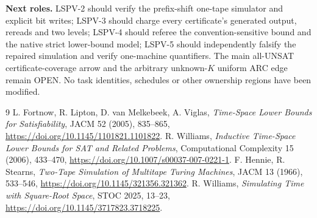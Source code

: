 \documentclass[11pt]{article}
\begin{document}
\noindent\textbf{Next roles.} LSPV-2 should verify the prefix-shift one-tape simulator and explicit bit writes; LSPV-3 should charge every certificate's generated output, rereads and two levels; LSPV-4 should referee the convention-sensitive bound and the native strict lower-bound model; LSPV-5 should independently falsify the repaired simulation and verify one-machine quantifiers. The main all-UNSAT certificate-coverage arrow and the arbitrary unknown-$K$ uniform ARC edge remain OPEN. No task identities, schedules or other ownership regions have been modified.

\begin{thebibliography}{9}
 L. Fortnow, R. Lipton, D. van Melkebeek, A. Viglas, \emph{Time-Space Lower Bounds for Satisfiability}, JACM 52 (2005), 835--865, \url{https://doi.org/10.1145/1101821.1101822}.
 R. Williams, \emph{Inductive Time-Space Lower Bounds for SAT and Related Problems}, Computational Complexity 15 (2006), 433--470, \url{https://doi.org/10.1007/s00037-007-0221-1}.
 F. Hennie, R. Stearns, \emph{Two-Tape Simulation of Multitape Turing Machines}, JACM 13 (1966), 533--546, \url{https://doi.org/10.1145/321356.321362}.
 R. Williams, \emph{Simulating Time with Square-Root Space}, STOC 2025, 13--23, \url{https://doi.org/10.1145/3717823.3718225}.
\end{thebibliography}
\end{document}
